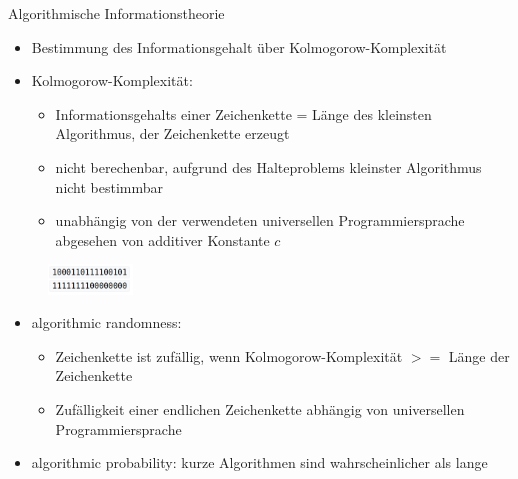 \documentclass[aspectratio=1610, 9pt]{beamer}
\begin{document}
\begin{frame}{Algorithmische Informationstheorie}
  \begin{itemize}
    \item Bestimmung des Informationsgehalt über Kolmogorow-Komplexität
    \item Kolmogorow-Komplexität:
    \begin{itemize}
      \item Informationsgehalts einer Zeichenkette = Länge des kleinsten Algorithmus, der Zeichenkette erzeugt
      \item nicht berechenbar, aufgrund des Halteproblems kleinster Algorithmus nicht bestimmbar
      \item unabhängig von der verwendeten universellen Programmiersprache abgesehen von additiver Konstante $c$
    \end{itemize}
  \end{itemize}
  \begin{figure}
    \includegraphics[width=0.2\textwidth]{images/kolmo.png}
  \end{figure}
  \begin{itemize}
    \item algorithmic randomness:
    \begin{itemize}
      \item Zeichenkette ist zufällig, wenn Kolmogorow-Komplexität $>=$ Länge der Zeichenkette
      \item Zufälligkeit einer endlichen Zeichenkette abhängig von universellen Programmiersprache
    \end{itemize}
    \item algorithmic probability: kurze Algorithmen sind wahrscheinlicher als lange
  \end{itemize}
\end{frame}
\end{document}
